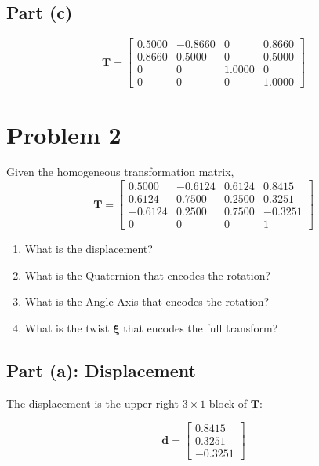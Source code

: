 \documentclass[11pt]{article}
\newcommand{\T}{\bm{T}}
\newcommand{\dvec}{\bm{d}}
\newcommand{\xivec}{\bm{\xi}}
\begin{document}
\subsection*{Part (c)}
\begin{result}
\[
    \T = \begin{bmatrix}
        0.5000 & -0.8660 & 0 & 0.8660\\
        0.8660 & 0.5000 & 0 & 0.5000\\
        0 & 0 & 1.0000 & 0\\
        0 & 0 & 0 & 1.0000
    \end{bmatrix}
\]
\end{result}

\newpage
\section*{Problem 2}

\begin{statement}
Given the homogeneous transformation matrix,
\[
    \T = \begin{bmatrix}
        0.5000 & -0.6124 & 0.6124 & 0.8415\\
        0.6124 & 0.7500 & 0.2500 & 0.3251\\
        -0.6124 & 0.2500 & 0.7500 & -0.3251\\
        0 & 0 & 0 & 1
    \end{bmatrix}
\]
\begin{enumerate}[label=(\alph*), leftmargin=1.6em, itemsep=2pt]
    \item What is the displacement?
    \item What is the Quaternion that encodes the rotation?
    \item What is the Angle-Axis that encodes the rotation?
    \item What is the twist $\xivec$ that encodes the full transform?
\end{enumerate}
\end{statement}

\subsection*{Part (a): Displacement}
The displacement is the upper-right $3\times1$ block of $\T$:
\begin{result}
\[
    \dvec = \begin{bmatrix} 0.8415\\ 0.3251\\ -0.3251 \end{bmatrix}
\]
\end{result}
\end{document}
